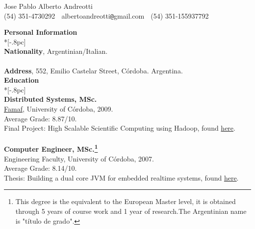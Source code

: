 \documentclass[letter,11pt,english]{article}
\begin{document}
\pagestyle{headings}
\setcounter{page}{1}

\begin{center}
{\Large Jose Pablo Alberto Andreotti} \\[.5pc]
(54) 351-4730292 $\;$ albertoandreotti\verb|@|gmail.com $\;$ (54) 351-155937792 \\[3pc]
\end{center}
{\large \bf Personal Information} \\*[-.8pc]
\underline{\hspace{6in}} \\
{\bf Nationality}, Argentinian/Italian.\\
\\
{\bf Address}, 552, Emilio Castelar Street, C\'ordoba. Argentina.\\

{\large \bf Education} \\*[-.8pc]
\underline{\hspace{6in}} \\
{\bf Distributed Systems, MSc.}\\
\href{http://www.famaf.unc.edu.ar/}{Famaf}, University of C\'ordoba, 2009. \\
Average Grade: 8.87/10. \\
Final Project: High Scalable Scientific Computing using Hadoop, found \href{https://docs.google.com/viewer?a=v&pid=explorer&chrome=true&srcid=0B5AOpwg8IzVANjJlODZhZDctNWUzMS00MmNhLWI3OWMtMWNhMTdjODQwNjVl&hl=en}{here}.\\
\\
{\bf Computer Engineer, MSc.\footnote {This degree is the equivalent to the European Master level, it is obtained
through 5 years of course work and 1 year of research.The Argentinian name is "t\'itulo de grado".}}\\
Engineering Faculty, University of C\'ordoba, 2007.\\
Average Grade: 8.14/10. \\
Thesis: Building a dual core JVM for embedded realtime systems, found \href{https://docs.google.com/viewer?a=v&pid=explorer&chrome=true&srcid=1gdJXYgQtLDHDOxGDtbKzdmAl1LmNx-yo4w6vNl-K_Z-1YocLhtJxMvoqGvd1&hl=en}{here}.\\
\end{document}
